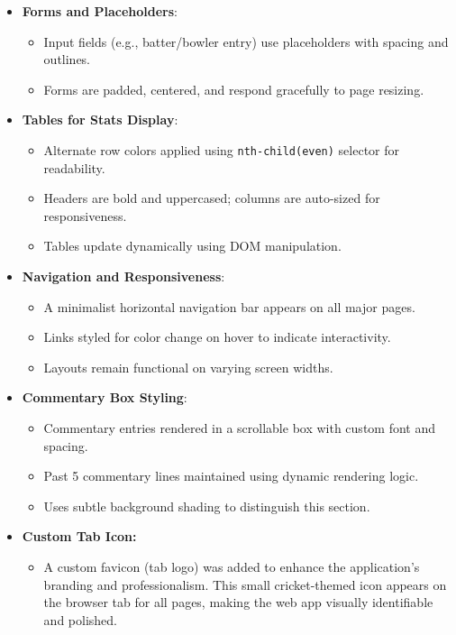 \documentclass[a4paper,10pt]{article}
\begin{document}
\begin{itemize}
    \item \textbf{Forms and Placeholders}:
    \begin{itemize}
        \item Input fields (e.g., batter/bowler entry) use placeholders with spacing and outlines.
        \item Forms are padded, centered, and respond gracefully to page resizing.
    \end{itemize}

    \item \textbf{Tables for Stats Display}:
    \begin{itemize}
        \item Alternate row colors applied using \texttt{nth-child(even)} selector for readability.
        \item Headers are bold and uppercased; columns are auto-sized for responsiveness.
        \item Tables update dynamically using DOM manipulation.
    \end{itemize}

    \item \textbf{Navigation and Responsiveness}:
    \begin{itemize}
        \item A minimalist horizontal navigation bar appears on all major pages.
        \item Links styled for color change on hover to indicate interactivity.
        \item Layouts remain functional on varying screen widths.
    \end{itemize}

    \item \textbf{Commentary Box Styling}:
    \begin{itemize}
        \item Commentary entries rendered in a scrollable box with custom font and spacing.
        \item Past 5 commentary lines maintained using dynamic rendering logic.
        \item Uses subtle background shading to distinguish this section.
    \end{itemize}
    \item\textbf{Custom Tab Icon:}
    \begin{itemize}
        \item A custom favicon (tab logo) was added to enhance the application's branding and professionalism. This small cricket-themed icon appears on the browser tab for all pages, making the web app visually identifiable and polished.
    \end{itemize}

\end{itemize}
\end{document}
